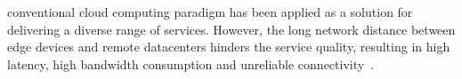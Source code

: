 \documentclass[10pt,journal,compsoc]{IEEEtran}
\begin{document}
\IEEEdisplaynontitleabstractindextext



%
\IEEEpeerreviewmaketitle







% 
% 
% 
% 
 conventional cloud computing paradigm has been applied as a solution for delivering a diverse range of services. However, the long network distance between edge devices and remote datacenters hinders the service quality, resulting in high latency, high bandwidth consumption and unreliable connectivity~\cite{Vaquero:2014:FYW:2677046.2677052}. 
\end{document}

